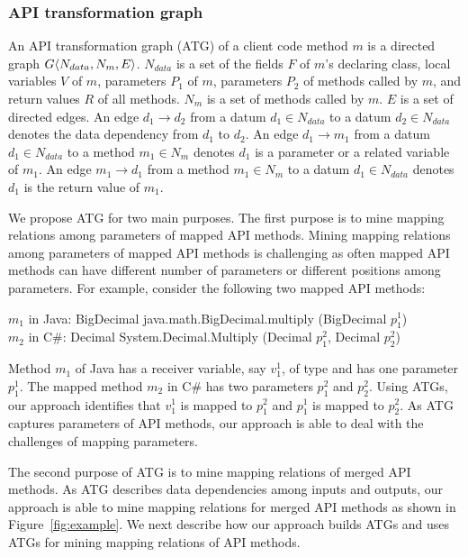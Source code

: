\subsubsection{API transformation graph} 

An API transformation graph (ATG) of a client code method $m$ is a directed graph
$G\langle N_{data}, N_{m}, E \rangle$. $N_{data}$ is a set of the fields $F$
of $m$'s declaring class, local variables $V$ of $m$,
parameters $P_1$ of $m$, parameters $P_2$ of methods called by
$m$, and return values $R$ of all methods. $N_{m}$ is a set
of methods called by $m$. $E$ is a set of directed edges. An edge
$d_1\rightarrow d_2$ from a datum $d_1 \in N_{data}$ to a datum
$d_2 \in N_{data}$ denotes the data dependency from $d_1$ to
$d_2$. An edge $d_1 \rightarrow m_1$ from a datum $d_1 \in
N_{data}$  to a method $ m_1 \in N_{m}$ denotes $d_1$ is a
parameter or a related variable of $m_1$. An edge $m_1 \rightarrow
d_1$ from a method $m_1 \in N_{m}$ to a datum $d_1 \in
N_{data}$ denotes $d_1$ is the return value of $m_1$.

We propose ATG for two main purposes. The first purpose is to mine mapping
relations among parameters of mapped API methods. Mining mapping relations
among parameters of mapped API methods is challenging as often mapped API methods
can have different number of parameters or different positions among
parameters. For example, consider the following two mapped API methods:

\begin{CodeOut}
$m_1$ in Java: BigDecimal java.math.BigDecimal.multiply (BigDecimal $p_1^1$)\\
\hspace*{0.11in}$m_2$ in C\#: Decimal System.Decimal.Multiply (Decimal $p_1^2$, Decimal $p_2^2$)
\end{CodeOut}

Method $m_1$ of Java has a receiver variable, say $v_1^1$, of type 
and has one parameter $p_1^1$. The mapped method $m_2$ in C\# has
two parameters $p_1^2$ and $p_2^2$. Using ATGs, our approach
identifies that $v_1^1$ is mapped to $p_1^2$ and $p_1^1$ is mapped
to $p_2^2$. As ATG captures parameters of API methods,
our approach is able to deal with the challenges of mapping parameters. 

The second purpose of ATG is to mine mapping relations of merged API methods. As ATG
describes data dependencies among inputs and outputs, our approach
is able to mine mapping relations for merged API methods as shown in
Figure~\ref{fig:example}. We next describe how our approach builds ATGs and
uses ATGs for mining mapping relations of API methods.

